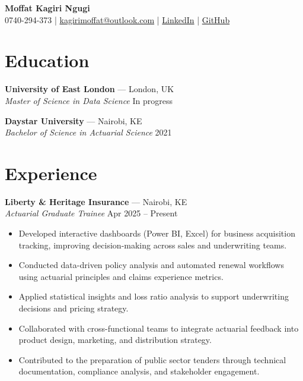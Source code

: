 \documentclass[11pt,a4paper]{article}
\begin{document}

\begin{center}
\textbf{\huge{Moffat Kagiri Ngugi}} \\[0.8em]
    0740-294-373 \quad | \quad \href{mailto:kagirimoffat@outlook.com} {kagirimoffat@outlook.com} \quad | \quad\href{https://www.linkedin.com/in/moffatkagiri/}{LinkedIn} \quad | \quad \href{https://github.com/moffat-kagiri}{GitHub}
    
\end{center}

\section*{Education}
\justifying
\textbf{University of East London} — London, UK \\
\textit{Master of Science in Data Science} \hfill In progress

\textbf{Daystar University} — Nairobi, KE \\
\textit{Bachelor of Science in Actuarial Science} \hfill 2021

\section*{Experience}
\textbf{Liberty \& Heritage Insurance} — Nairobi, KE \\
\textit{Actuarial Graduate Trainee} \hfill Apr 2025 – Present
\begin{itemize}[leftmargin=*]
    \item Developed interactive dashboards (Power BI, Excel) for business acquisition tracking, improving decision-making across sales and underwriting teams.
    \item Conducted data-driven policy analysis and automated renewal workflows using actuarial principles and claims experience metrics.
    \item Applied statistical insights and loss ratio analysis to support underwriting decisions and pricing strategy.
    \item Collaborated with cross-functional teams to integrate actuarial feedback into product design, marketing, and distribution strategy.
    \item Contributed to the preparation of public sector tenders through technical documentation, compliance analysis, and stakeholder engagement.
\end{itemize}
\end{document}

